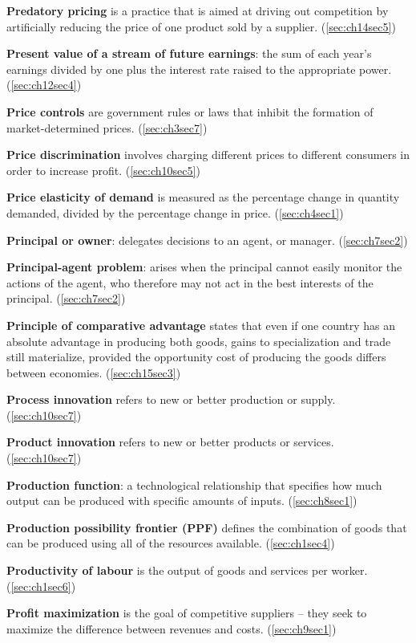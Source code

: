 \textbf{Predatory pricing} is a practice that is aimed at driving out competition by artificially reducing the price of one product sold by a supplier. (\ref{sec:ch14sec5})

\textbf{Present value of a stream of future earnings}: the sum of each year's earnings divided by one plus the interest rate raised to the appropriate power. (\ref{sec:ch12sec4})

\textbf{Price controls} are government rules or laws that inhibit the formation of market-determined prices. (\ref{sec:ch3sec7})

\textbf{Price discrimination} involves charging different prices to different consumers in order to increase profit. (\ref{sec:ch10sec5})

\textbf{Price elasticity of demand} is measured as the percentage change in quantity demanded, divided by the percentage change in price. (\ref{sec:ch4sec1})

\textbf{Principal or owner}: delegates decisions to an agent, or manager. (\ref{sec:ch7sec2})

\textbf{Principal-agent problem}: arises when the principal cannot easily monitor the actions of the agent, who therefore may not act in the best interests of the principal. (\ref{sec:ch7sec2})

\textbf{Principle of comparative advantage} states that even if one country has an absolute advantage in producing both goods, gains to specialization and trade still materialize, provided the opportunity cost of producing the goods differs between economies. (\ref{sec:ch15sec3})

\textbf{Process innovation} refers to new or better production or supply. (\ref{sec:ch10sec7})

\textbf{Product innovation} refers to new or better products or services. (\ref{sec:ch10sec7})

\textbf{Production function}: a technological relationship that specifies how much output can be produced with specific amounts of inputs. (\ref{sec:ch8sec1})

\textbf{Production possibility frontier (PPF)} defines the combination of goods that can be produced using all of the resources available. (\ref{sec:ch1sec4})

\textbf{Productivity of labour} is the output of goods and services per worker. (\ref{sec:ch1sec6})

\textbf{Profit maximization} is the goal of competitive suppliers -- they seek to maximize the difference between revenues and costs. (\ref{sec:ch9sec1})

